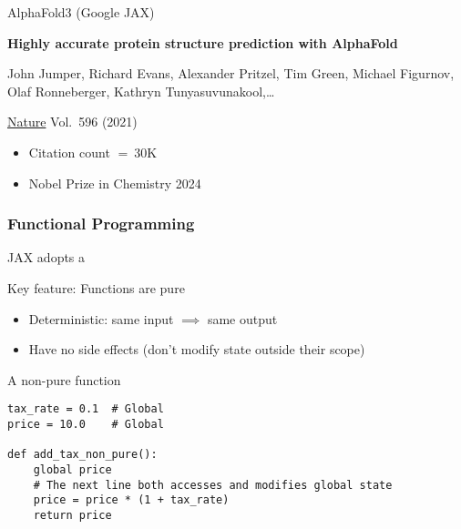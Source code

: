 \begin{frame}
    
    \Eg AlphaFold3 (Google JAX)

        \vspace{0.5em}
    \textbf{Highly accurate protein structure prediction with AlphaFold}

        \vspace{0.5em}
    John Jumper, Richard Evans, Alexander Pritzel, Tim Green, Michael Figurnov,
    Olaf Ronneberger, Kathryn Tunyasuvunakool,\ldots 

        \vspace{0.5em}
    \underline{Nature} Vol.\ 596 (2021)

    \vspace{0.5em}
    \vspace{0.5em}
    \vspace{0.5em}
    \vspace{0.5em}
    \begin{itemize}
        \item Citation count $= ~30$K
        \vspace{0.5em}
        \item Nobel Prize in Chemistry 2024
    \end{itemize}

\end{frame}


\begin{frame}
    \frametitle{Functional Programming}
    
    JAX adopts a 

    \vspace{0.5em}
    \vspace{0.5em}
    \vspace{0.5em}
    \vspace{0.5em}
    Key feature: Functions are pure

    \begin{itemize}
        \item Deterministic: same input $\implies$ same output 
        \item Have no side effects (don't modify state outside their scope)
    \end{itemize}

\end{frame}


\begin{frame}[fragile]

    A non-pure function

    \begin{verbatim}
tax_rate = 0.1  # Global 
price = 10.0    # Global

def add_tax_non_pure():
    global price                
    # The next line both accesses and modifies global state
    price = price * (1 + tax_rate)    
    return price 
    \end{verbatim}
    
\end{frame}


